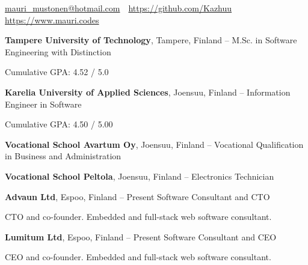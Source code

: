 \documentclass[letterpaper,MMMyyyy,nonstopmode]{simpleresumecv}
\newcommand{\CVAuthor}{Mauri Mustonen}
\newcommand{\CVWebpage}{https://www.mauri.codes}
\begin{document}

\Title{\CVAuthor}

\begin{SubTitle}
    \par
    \href{mailto:mauri\_mustonen@hotmail.com}{mauri\_mustonen@hotmail.com}\,
    \SubBulletSymbol\,
    \href{https://github.com/Kazhuu}{https://github.com/Kazhuu}\,
    \SubBulletSymbol\,
    \href{\CVWebpage}{\url{\CVWebpage}}
\end{SubTitle}

\begin{Body}



\Entry
\textbf{Tampere University of Technology}, Tampere, Finland
\hfill
{} -- 
\Gap
\BulletItem
M.Sc. in Software Engineering with Distinction
\begin{Detail}
    \SubBulletItem Cumulative GPA: 4.52 / 5.0
\end{Detail}

\BigGap
\Entry
\textbf{Karelia University of Applied Sciences}, Joensuu, Finland
\hfill
{} -- 
\Gap
\BulletItem
Information Engineer in Software
\begin{Detail}
    \SubBulletItem Cumulative GPA: 4.50 / 5.00
\end{Detail}

\BigGap
\Entry
\textbf{Vocational School Avartum Oy}, Joensuu, Finland
\hfill
{} -- 
\Gap
\BulletItem
Vocational Qualification in Business and Administration

\BigGap
\Entry
\textbf{Vocational School Peltola}, Joensuu, Finland
\hfill
{} -- 
\Gap
\BulletItem
Electronics Technician



\Entry
\BigGap
\Entry
\textbf{Advaun Ltd}, Espoo, Finland
\hfill
{} -- Present
\Gap
\BulletItem Software Consultant and CTO
\begin{Detail}
    \SubBulletItem CTO and co-founder.
    \SubBulletItem Embedded and full-stack web software consultant.
\end{Detail}

\BigGap
\Entry
\textbf{Lumitum Ltd}, Espoo, Finland
\hfill
{} -- Present
\Gap
\BulletItem Software Consultant and CEO
\begin{Detail}
    \SubBulletItem CEO and co-founder.
    \SubBulletItem Embedded and full-stack web software consultant.
\end{Detail}


\end{Body}
\end{document}
